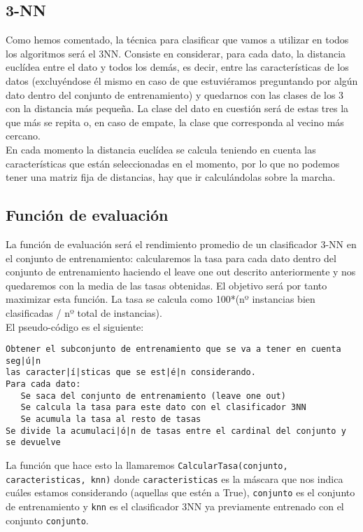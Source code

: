 \documentclass[12pt]{article}
\begin{document}
\subsection{3-NN}
Como hemos comentado, la técnica para clasificar que vamos a utilizar en todos los algoritmos será el 3NN. Consiste en considerar, para cada dato, la distancia euclídea entre el dato y todos los demás, es decir, entre las características de los datos (excluyéndose él mismo en caso de que estuviéramos preguntando por algún dato dentro del conjunto de entrenamiento) y quedarnos con las clases de los 3 con la distancia más pequeña. La clase del dato en cuestión será de estas tres la que más se repita o, en caso de empate, la clase que corresponda al vecino más cercano.\\
En cada momento la distancia euclídea se calcula teniendo en cuenta las características que están seleccionadas en el momento, por lo que no podemos tener una matriz fija de distancias, hay que ir calculándolas sobre la marcha.

\subsection{Función de evaluación}
La función de evaluación será el rendimiento promedio de un clasificador 3-NN en el conjunto de entrenamiento: calcularemos la tasa para cada dato dentro del conjunto de entrenamiento haciendo el leave one out descrito anteriormente y nos quedaremos con la media de las tasas obtenidas. El objetivo será por tanto maximizar esta función.
La tasa se calcula como 100*(nº instancias bien clasificadas / nº total de instancias).\\

El pseudo-código es el siguiente:\\
\begin{lstlisting}
Obtener el subconjunto de entrenamiento que se va a tener en cuenta seg|ú|n 
las caracter|í|sticas que se est|é|n considerando.
Para cada dato:
   Se saca del conjunto de entrenamiento (leave one out)
   Se calcula la tasa para este dato con el clasificador 3NN
   Se acumula la tasa al resto de tasas
Se divide la acumulaci|ó|n de tasas entre el cardinal del conjunto y se devuelve
\end{lstlisting}
La función que hace esto la llamaremos \texttt{CalcularTasa(conjunto, caracteristicas, knn)} donde \texttt{caracteristicas} es la máscara que nos indica cuáles estamos considerando (aquellas que estén a True), \texttt{conjunto} es el conjunto de entrenamiento y \texttt{knn} es el clasificador 3NN ya previamente entrenado con el conjunto \texttt{conjunto}.\\
\end{document}
